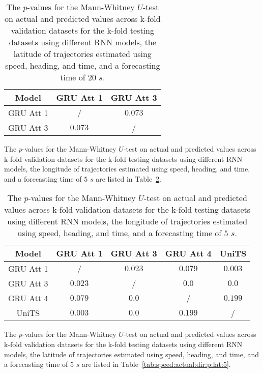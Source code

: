 \begin{table}[!ht]
	\centering
	\begin{tabular}{|c|c|c|}
		\hline
		Model & GRU Att 1 & GRU Att 3 \\ \hline
		GRU Att 1 & / & $\mathbf{0.073}$ \\ \hline
		GRU Att 3 & $\mathbf{0.073}$ & / \\ \hline
	\end{tabular}
	\caption{The $p$-values for the Mann-Whitney $U$-test on actual and predicted values across k-fold validation datasets for the k-fold testing datasets using different RNN models, the latitude of trajectories estimated using speed, heading, and time, and a forecasting time of $20$ $s$.}
	\label{tab:speed:actual:dir:p:lat:20}
\end{table}

The $p$-values for the Mann-Whitney $U$-test on actual and predicted values across k-fold validation datasets for the k-fold testing datasets using different RNN models, the longitude of trajectories estimated using speed, heading, and time, and a forecasting time of $5$ $s$ are listed in Table~\ref{tab:speed:actual:dir:p:long:5}.

\begin{table}[!ht]
	\centering
	\begin{tabular}{|c|c|c|c|c|}
		\hline
		Model & GRU Att 1 & GRU Att 3 & GRU Att 4 & UniTS \\ \hline
		GRU Att 1 & / & $\mathbf{0.023}$ & $\mathbf{0.079}$ & $\mathbf{0.003}$ \\ \hline
		GRU Att 3 & $\mathbf{0.023}$ & / & $0.0$ & $0.0$ \\ \hline
		GRU Att 4 & $\mathbf{0.079}$ & $0.0$ & / & $\mathbf{0.199}$ \\ \hline
		UniTS & $\mathbf{0.003}$ & $0.0$ & $\mathbf{0.199}$ & / \\ \hline
	\end{tabular}
	\caption{The $p$-values for the Mann-Whitney $U$-test on actual and predicted values across k-fold validation datasets for the k-fold testing datasets using different RNN models, the longitude of trajectories estimated using speed, heading, and time, and a forecasting time of $5$ $s$.}
	\label{tab:speed:actual:dir:p:long:5}
\end{table}

The $p$-values for the Mann-Whitney $U$-test on actual and predicted values across k-fold validation datasets for the k-fold testing datasets using different RNN models, the latitude of trajectories estimated using speed, heading, and time, and a forecasting time of $5$ $s$ are listed in Table~\ref{tab:speed:actual:dir:p:lat:5}.

